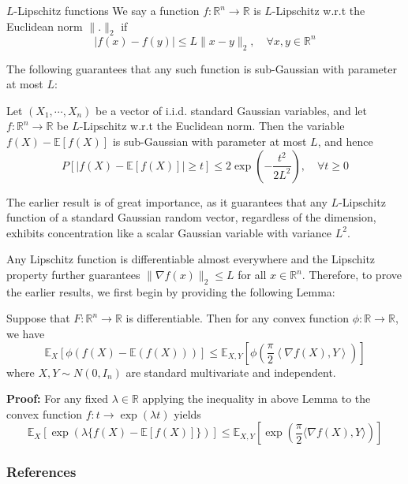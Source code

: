 \documentclass[10pt,handout,english]{beamer}
\newcommand{\E}{\mathbb{E}}
\newcommand{\R}{\mathbb{R}}
\begin{document}
\begin{frame}[allowframebreaks]
\begin{block}{$L$-Lipschitz functions}
We say a function $f:\R^n\to\R$ is $L$-Lipschitz w.r.t the Euclidean norm $\lVert.\rVert_2$ if
\[
\lvert f(x)-f(y)\rvert\leq L\lVert x-y\rVert_2,\quad\forall x,y\in\R^n
\]
\end{block}
The following guarantees that any such function is sub-Gaussian with parameter at most $L$:
\begin{block}{}
Let $(X_1,\cdots,X_n)$ be a vector of i.i.d. standard Gaussian variables, and let $f:\R^n\to\R$ be $L$-Lipschitz w.r.t the Euclidean norm. Then the variable $f(X)-\E[f(X)]$ is sub-Gaussian with parameter at most $L$, and hence
\[
P[\lvert f(X)-\E[f(X)]\rvert\geq t]\leq 2\exp\left(-\frac{t^2}{2L^2}\right),\quad\forall t\geq0
\]
\end{block}

The earlier result is of great importance, as it guarantees that any $L$-Lipschitz function of a standard  Gaussian random vector, regardless of the dimension, exhibits concentration like a scalar Gaussian variable with variance $L^2$. 

Any Lipschitz function is differentiable almost everywhere and the Lipschitz property further guarantees $\lVert\nabla f(x)\rVert_2\leq L$ for all $x\in\R^n$. Therefore, to prove the earlier results, we first begin by providing the following Lemma:
\begin{lemma}
Suppose that $F:\R^n\to\R$ is differentiable. Then for any convex function $\phi:\R\to\R$, we have
\[
\E_X[\phi(f(X)-\E(f(X)))]\leq\E_{X,Y}\left[\phi\left(\frac{\pi}{2}\left\langle\nabla f(X),Y\right\rangle\right)\right]
\]
where $X,Y\sim N(0,I_n)$ are standard multivariate and independent.
\end{lemma}

\textbf{Proof:}
For any fixed $\lambda\in\R$ applying the inequality in above Lemma to the convex function $f: t\to \exp(\lambda t)$ yields
 \[
\E_{X}[\exp(\lambda\{f(X)- \E[f(X)]\})]\leq \E_{X,Y}\left[\exp\left(\frac{\pi}{2}\langle \nabla f(X),Y \rangle\right)\right]
\]

\end{frame}




\begin{frame}[allowframebreaks]
\frametitle{References}


\end{frame}
\end{document}
